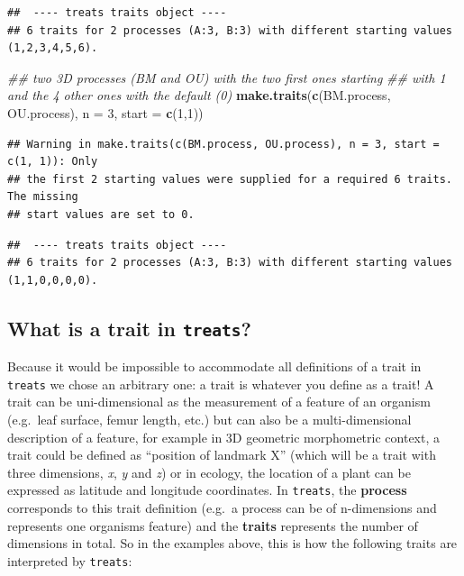 \documentclass[
]{book}
\newenvironment{Shaded}{\begin{snugshade}}{\end{snugshade}}
\newcommand{\CommentTok}[1]{\textcolor[rgb]{0.56,0.35,0.01}{\textit{#1}}}
\newcommand{\DataTypeTok}[1]{\textcolor[rgb]{0.13,0.29,0.53}{#1}}
\newcommand{\DecValTok}[1]{\textcolor[rgb]{0.00,0.00,0.81}{#1}}
\newcommand{\KeywordTok}[1]{\textcolor[rgb]{0.13,0.29,0.53}{\textbf{#1}}}
\newcommand{\NormalTok}[1]{#1}
\begin{document}
\begin{verbatim}
##  ---- treats traits object ---- 
## 6 traits for 2 processes (A:3, B:3) with different starting values (1,2,3,4,5,6).
\end{verbatim}

\begin{Shaded}
\begin{Highlighting}[]
\CommentTok{\#\# two 3D processes (BM and OU) with the two first ones starting}
\CommentTok{\#\# with 1 and the 4 other ones with the default (0)}
\KeywordTok{make.traits}\NormalTok{(}\KeywordTok{c}\NormalTok{(BM.process, OU.process), }\DataTypeTok{n =} \DecValTok{3}\NormalTok{, }\DataTypeTok{start =} \KeywordTok{c}\NormalTok{(}\DecValTok{1}\NormalTok{,}\DecValTok{1}\NormalTok{))}
\end{Highlighting}
\end{Shaded}

\begin{verbatim}
## Warning in make.traits(c(BM.process, OU.process), n = 3, start = c(1, 1)): Only
## the first 2 starting values were supplied for a required 6 traits. The missing
## start values are set to 0.
\end{verbatim}

\begin{verbatim}
##  ---- treats traits object ---- 
## 6 traits for 2 processes (A:3, B:3) with different starting values (1,1,0,0,0,0).
\end{verbatim}

\hypertarget{what-is-a-trait-in-treats}{%
\subsection{\texorpdfstring{What is a trait in \texttt{treats}?}{What is a trait in treats?}}\label{what-is-a-trait-in-treats}}

Because it would be impossible to accommodate all definitions of a trait in \texttt{treats} we chose an arbitrary one: a trait is whatever you define as a trait!
A trait can be uni-dimensional as the measurement of a feature of an organism (e.g.~leaf surface, femur length, etc.) but can also be a multi-dimensional description of a feature, for example in 3D geometric morphometric context, a trait could be defined as ``position of landmark X'' (which will be a trait with three dimensions, \emph{x}, \emph{y} and \emph{z}) or in ecology, the location of a plant can be expressed as latitude and longitude coordinates.
In \texttt{treats}, the \textbf{process} corresponds to this trait definition (e.g.~a process can be of n-dimensions and represents one organisms feature) and the \textbf{traits} represents the number of dimensions in total.
So in the examples above, this is how the following traits are interpreted by \texttt{treats}:
\end{document}
